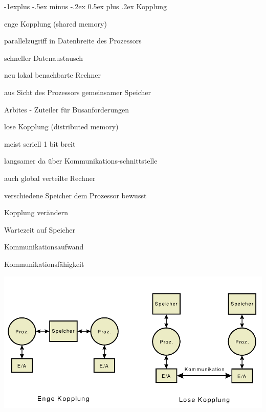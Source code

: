\documentclass[10pt,landscape]{article}
\makeatletter
\renewcommand{\subsection}{\@startsection{subsection}{2}{0mm}%
                                {-1explus -.5ex minus -.2ex}%
                                {0.5ex plus .2ex}%
                                {\normalfont\normalsize\bfseries}}
\makeatother
\begin{document}
\begin{multicols}{3}
  
  \subsection{Kopplung}
  \begin{description*}
    \item[enge Kopplung] (shared memory)
    \begin{itemize*}
      \item parallelzugriff in Datenbreite des Prozessors
      \item schneller Datenaustausch 
      \item neu lokal benachbarte Rechner
      \item aus Sicht des Prozessors gemeinsamer Speicher
      \item Arbites - Zuteiler für Busanforderungen
    \end{itemize*}
    \item[lose Kopplung] (distributed memory)
    \begin{itemize*}
      \item meist seriell 1 bit breit
      \item langsamer da über Kommunikations-schnittstelle
      \item auch global verteilte Rechner
      \item verschiedene Speicher dem Prozessor bewusst
    \end{itemize*}
    \item[Kopplung] verändern
    \begin{itemize*}
      \item Wartezeit auf Speicher
      \item Kommunikationsaufwand
      \item Kommunikationsfähigkeit
    \end{itemize*}
  \end{description*}
  \begin{center}
    \includegraphics[width=\textwidth/7]{Assets/RA2_Enge und lose Kopplung.png}

\end{center}
\end{multicols}
\end{document}
